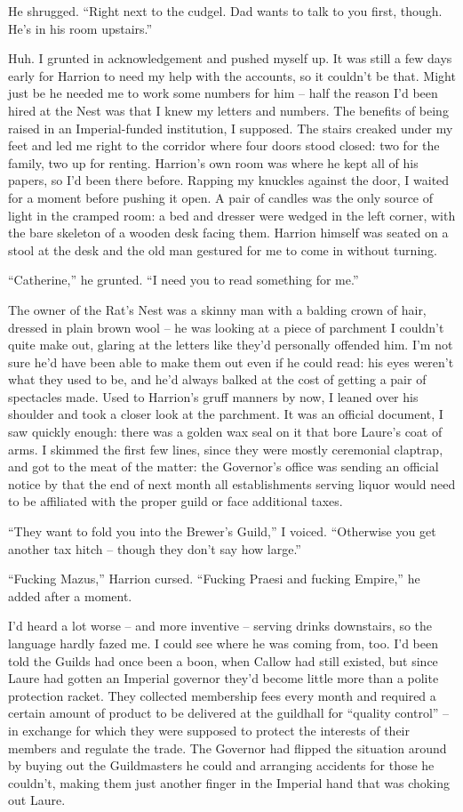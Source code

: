 \documentclass[12pt, openany]{book}
\begin{document}
He shrugged. “Right next to the cudgel. Dad wants to talk to you first, though. He’s in his room upstairs.”

Huh. I grunted in acknowledgement and pushed myself up. It was still a few days early for Harrion to need my help with the accounts, so it couldn’t be that. Might just be he needed me to work some numbers for him – half the reason I’d been hired at the Nest was that I knew my letters and numbers. The benefits of being raised in an Imperial-funded institution, I supposed. The stairs creaked under my feet and led me right to the corridor where four doors stood closed: two for the family, two up for renting. Harrion’s own room was where he kept all of his papers, so I’d been there before. Rapping my knuckles against the door, I waited for a moment before pushing it open. A pair of candles was the only source of light in the cramped room: a bed and dresser were wedged in the left corner, with the bare skeleton of a wooden desk facing them. Harrion himself was seated on a stool at the desk and the old man gestured for me to come in without turning.

“Catherine,” he grunted. “I need you to read something for me.”

The owner of the Rat’s Nest was a skinny man with a balding crown of hair, dressed in plain brown wool – he was looking at a piece of parchment I couldn’t quite make out, glaring at the letters like they’d personally offended him. I’m not sure he’d have been able to make them out even if he could read: his eyes weren’t what they used to be, and he’d always balked at the cost of getting a pair of spectacles made. Used to Harrion’s gruff manners by now, I leaned over his shoulder and took a closer look at the parchment. It was an official document, I saw quickly enough: there was a golden wax seal on it that bore Laure’s coat of arms. I skimmed the first few lines, since they were mostly ceremonial claptrap, and got to the meat of the matter: the Governor’s office was sending an official notice by that the end of next month all establishments serving liquor would need to be affiliated with the proper guild or face additional taxes.

“They want to fold you into the Brewer’s Guild,” I voiced. “Otherwise you get another tax hitch – though they don’t say how large.”

“Fucking Mazus,” Harrion cursed. “Fucking Praesi and fucking Empire,” he added after a moment.

I’d heard a lot worse – and more inventive – serving drinks downstairs, so the language hardly fazed me. I could see where he was coming from, too. I’d been told the Guilds had once been a boon, when Callow had still existed, but since Laure had gotten an Imperial governor they’d become little more than a polite protection racket. They collected membership fees every month and required a certain amount of product to be delivered at the guildhall for “quality control” – in exchange for which they were supposed to protect the interests of their members and regulate the trade. The Governor had flipped the situation around by buying out the Guildmasters he could and arranging accidents for those he couldn’t, making them just another finger in the Imperial hand that was choking out Laure.
\end{document}
